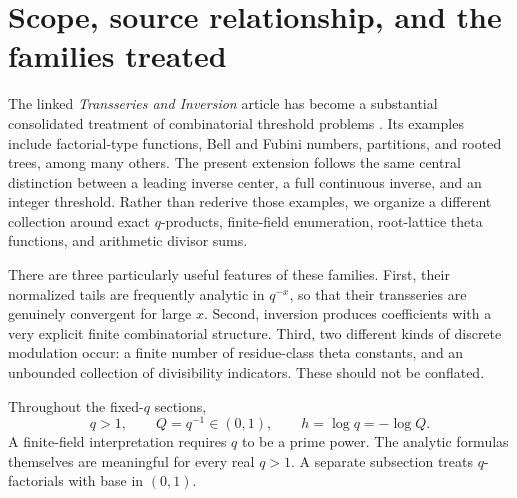 \documentclass[11pt]{article}
\numberwithin{equation}{section}
\theoremstyle{definition}
\begin{document}
\section{Scope, source relationship, and the families treated}
\label{sec:scope}

The linked \emph{Transseries and Inversion} article has become a substantial consolidated treatment of combinatorial threshold problems \cite{base}. Its examples include factorial-type functions, Bell and Fubini numbers, partitions, and rooted trees, among many others. The present extension follows the same central distinction between a leading inverse center, a full continuous inverse, and an integer threshold. Rather than rederive those examples, we organize a different collection around exact $q$-products, finite-field enumeration, root-lattice theta functions, and arithmetic divisor sums.

There are three particularly useful features of these families. First, their normalized tails are frequently analytic in $q^{-x}$, so that their transseries are genuinely convergent for large $x$. Second, inversion produces coefficients with a very explicit finite combinatorial structure. Third, two different kinds of discrete modulation occur: a finite number of residue-class theta constants, and an unbounded collection of divisibility indicators. These should not be conflated.

Throughout the fixed-$q$ sections,
\begin{equation}\label{eq:qnotation}
 q>1,\qquad Q=q^{-1}\in(0,1),\qquad h=\log q=-\log Q.
\end{equation}
A finite-field interpretation requires $q$ to be a prime power. The analytic formulas themselves are meaningful for every real $q>1$. A separate subsection treats $q$-factorials with base in $(0,1)$.
\end{document}
